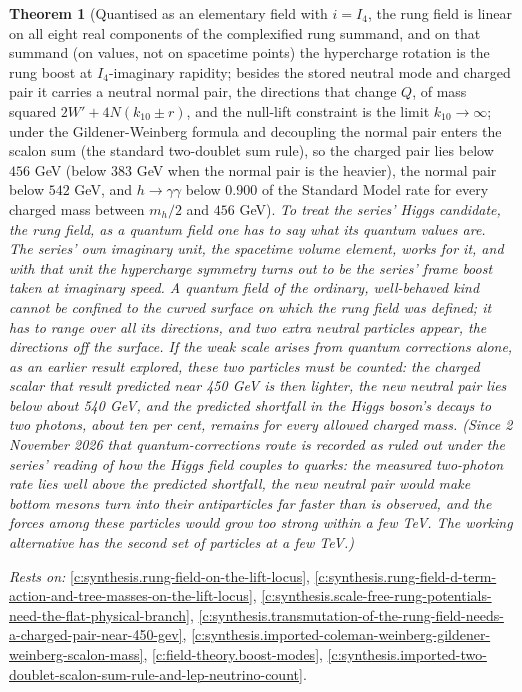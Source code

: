 \documentclass[11pt]{article}
\newtheorem{theorem}{Theorem}[section]
\theoremstyle{definition}
\theoremstyle{plain}
\begin{document}
\begin{theorem}[Quantised as an elementary field with $i = I_{4}$, the rung field is linear on all eight real components of the complexified rung summand, and on that summand (on values, not on spacetime points) the hypercharge rotation is the rung boost at $I_{4}$-imaginary rapidity; besides the stored neutral mode and charged pair it carries a neutral normal pair, the directions that change $Q$, of mass squared $2W' + 4N(k_{10} \pm r)$, and the null-lift constraint is the limit $k_{10} \to \infty$; under the Gildener-Weinberg formula and decoupling the normal pair enters the scalon sum (the standard two-doublet sum rule), so the charged pair lies below $456$ GeV (below $383$ GeV when the normal pair is the heavier), the normal pair below $542$ GeV, and $h \to \gamma\gamma$ below $0.900$ of the Standard Model rate for every charged mass between $m_{h}/2$ and $456$ GeV]\label{c:synthesis.linear-rung-field-has-a-neutral-normal-pair-in-the-scalon-sum}
To treat the series' Higgs candidate, the rung field, as a quantum field one has to say what its quantum values are. The series' own imaginary unit, the spacetime volume element, works for it, and with that unit the hypercharge symmetry turns out to be the series' frame boost taken at imaginary speed. A quantum field of the ordinary, well-behaved kind cannot be confined to the curved surface on which the rung field was defined; it has to range over all its directions, and two extra neutral particles appear, the directions off the surface. If the weak scale arises from quantum corrections alone, as an earlier result explored, these two particles must be counted: the charged scalar that result predicted near 450 GeV is then lighter, the new neutral pair lies below about 540 GeV, and the predicted shortfall in the Higgs boson's decays to two photons, about ten per cent, remains for every allowed charged mass. (Since 2 November 2026 that quantum-corrections route is recorded as ruled out under the series' reading of how the Higgs field couples to quarks: the measured two-photon rate lies well above the predicted shortfall, the new neutral pair would make bottom mesons turn into their antiparticles far faster than is observed, and the forces among these particles would grow too strong within a few TeV. The working alternative has the second set of particles at a few TeV.)
\end{theorem}
\noindent\emph{Rests on:} \ref{c:synthesis.rung-field-on-the-lift-locus}, \ref{c:synthesis.rung-field-d-term-action-and-tree-masses-on-the-lift-locus}, \ref{c:synthesis.scale-free-rung-potentials-need-the-flat-physical-branch}, \ref{c:synthesis.transmutation-of-the-rung-field-needs-a-charged-pair-near-450-gev}, \ref{c:synthesis.imported-coleman-weinberg-gildener-weinberg-scalon-mass}, \ref{c:field-theory.boost-modes}, \ref{c:synthesis.imported-two-doublet-scalon-sum-rule-and-lep-neutrino-count}.
\end{document}
